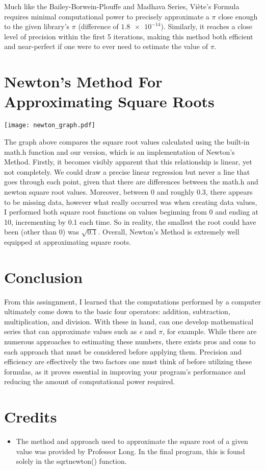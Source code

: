 \documentclass[12pt]{article}
\begin{document}
Much like the Bailey-Borwein-Plouffe and Madhava Series, Vi{\`e}te's Formula requires minimal computational power to precisely approximate a $\pi$ close enough to the given library's $\pi$ (difference of $\num{1.8e-14}$). Similarly, it reaches a close level of precision within the first 5 iterations, making this method both efficient and near-perfect if one were to ever need to estimate the value of $\pi$.

\section{Newton's Method For Approximating Square Roots}
\normalsize

\texttt{[image: newton\_graph.pdf]}

The graph above compares the square root values calculated using the built-in math.h function and our version, which is an implementation of Newton's Method. Firstly, it becomes visibly apparent that this relationship is linear, yet not completely. We could draw a precise linear regression but never a line that goes through each point, given that there are differences between the math.h and newton square root values. Moreover, between 0 and roughly 0.3, there appears to be missing data, however what really occurred was when creating data values, I performed both square root functions on values beginning from 0 and ending at 10, incrementing by 0.1 each time. So in reality, the smallest the root could have been (other than 0) was $\sqrt{0.1}$. Overall, Newton's Method is extremely well equipped at approximating square roots.

\section{Conclusion}
\normalsize

From this assingnment, I learned that the computations performed by a computer ultimately come down to the basic four operators: addition, subtraction, multiplication, and division. With these in hand, can one develop mathematical series that can approximate values such as \textit{e} and $\pi$, for example. While there are numerous approaches to estimating these numbers, there exists pros and cons to each approach that must be considered before applying them. Precision and efficiency are effectively the two factors one must think of before utilizing these formulas, as it proves essential in improving your program's performance and reducing the amount of computational power required.


\section{Credits}
\normalsize
\begin{itemize}
\item The method and approach used to approximate the square root of a given value was provided by Professor Long. In the final program, this is found solely in the sqrt\textunderscore newton() function.

\end{itemize}
\end{document}
